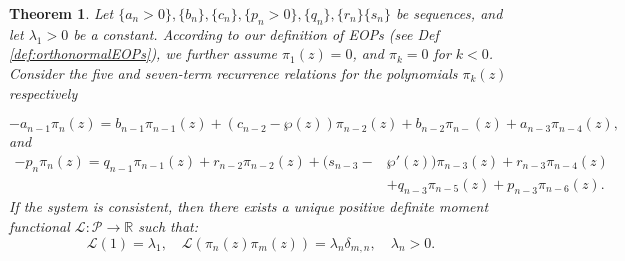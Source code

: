 \documentclass[11pt,a4paper]{article}
\newtheorem{theorem}{Theorem}
\theoremstyle{definition}
\numberwithin{equation}{section}
\numberwithin{theorem}{section}
\newcommand{\myrmk}[2]{\begin{quote}\fbox{\begin{minipage}{\linewidth}\small \noindent{\color{red}\bf #2:} #1{\color{red}}\end{minipage}}\end{quote}}
\newcommand{\rmkH}[1]{\myrmk{#1}{HD}}
\begin{document}
\begin{theorem}
Let \( \{a_n>0\}, \{b_n\}, \{c_n\}, \{p_n>0\}, \{q_n\}, \{r_n\} \{s_n\}\) be sequences, and let \( \lambda_1>0 \) be a constant. According to our definition of EOPs (see Def \ref{def:orthonormalEOPs}), we further assume  $\pi_1(z)=0$, and $\pi_{k}=0$ for $k<0$. 
Consider the five and seven-term recurrence relations for the polynomials $\pi_k(z)$ respectively

\begin{equation}\label{5t}
   - a_{n-1} \pi_n(z) = b_{n-1} \pi_{n-1}(z) + (c_{n-2} - \wp(z)) \pi_{n-2}(z) + b_{n-2} \pi_{n-}(z) + a_{n-3} \pi_{n-4}(z),
\end{equation}
and
\begin{equation}\label{7t}
\begin{aligned}
-p_n \pi_n(z) = q_{n-1} \pi_{n-1}(z) + r_{n-2} \pi_{n-2}(z) + ( s_{n-3}-&\wp'(z)) \pi_{n-3}(z) + r_{n-3} \pi_{n-4}(z)\\& + q_{n-3} \pi_{n-5}(z) + p_{n-3} \pi_{n-6}(z).
\end{aligned}\end{equation}
 If the system is consistent, then there exists a unique positive definite moment functional \( \mathcal{L}: \mathcal{P} \to \mathbb{R} \) such that:
\[
\mathcal{L}(1) = \lambda_1, \quad \mathcal{L}(\pi_n(z) \pi_m(z)) = \lambda_n \delta_{m,n},
\quad \lambda_n>0.\]
\end{theorem}
\end{document}
